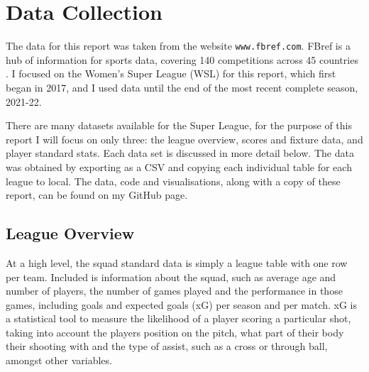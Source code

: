 \documentclass[12pt, a4paper, twocolumn]{article}
\begin{document}

\twocolumn[
  \begin{@twocolumnfalse}
    \maketitle
    \begin{abstract}
      \abstractText
      \newline
      \newline
    \end{abstract}
  \end{@twocolumnfalse}
]


\section{Data Collection}

The data for this report was taken from the website \verb|www.fbref.com|. FBref is a hub of information for sports data, covering 140 competitions across 45 countries \cite{fbref}. I focused on the Women's Super League (WSL) for this report, which first began in 2017, and I used data until the end of the most recent complete season, 2021-22. 

There are many datasets available for the Super League, for the purpose of this report I will focus on only three: the league overview, scores and fixture data, and player standard stats. Each data set is discussed in more detail below. The data was obtained by exporting as a CSV and copying each individual table for each league to local. The data, code and visualisations, along with a copy of these report, can be found on my GitHub page\cite{git}.

\subsection{League Overview}

At a high level, the squad standard data\cite{overview} is simply a league table with one row per team. Included is information about the squad, such as average age and number of players, the number of games played and the performance in those games, including goals and expected goals (xG) per season and per match. xG is a statistical tool to measure the likelihood of a player scoring a particular shot, taking into account the players position on the pitch, what part of their body their shooting with and the type of assist, such as a cross or through ball, amongst other variables\cite{xg}.
\end{document}
